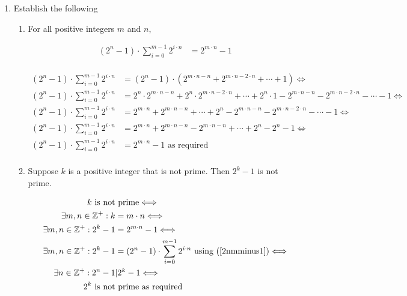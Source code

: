 \documentclass[10pt,\jkfside,a4paper]{article}
\begin{document}
\begin{enumerate}

\item Establish the following

\begin{enumerate}

\item For all positive integers $m$ and $n$,

\begin{equation}
\begin{split}
(2^n - 1)\cdot \sum^{m-1}_{i=0} 2^{i \cdot n} &= 2^{m \cdot n} - 1\\
\end{split}
\end{equation}

\begin{equation}\label{2nmminus1}
\begin{split}
(2^n - 1)\cdot \sum^{m-1}_{i=0} 2^{i \cdot n} &= (2^n - 1)\cdot(2^{m \cdot n - n} + 2^{m \cdot n - 2\cdot n} + \cdots + 1) \Longleftrightarrow\\
(2^n - 1)\cdot \sum^{m-1}_{i=0} 2^{i \cdot n} &= 2^n \cdot 2^{m \cdot n - n} + 2^n \cdot 2^{m \cdot n - 2\cdot n} + \cdots + 2^n \cdot 1 - 2^{m \cdot n - n} - 2^{m \cdot n - 2\cdot n} - \cdots - 1 \Longleftrightarrow \\
(2^n - 1)\cdot \sum^{m-1}_{i=0} 2^{i \cdot n} &= 2^{m \cdot n} + 2^{m \cdot n - n} + \cdots + 2^n - 2^{m \cdot n - n} - 2^{m \cdot n - 2\cdot n} - \cdots - 1 \Longleftrightarrow \\
(2^n - 1)\cdot \sum^{m-1}_{i=0} 2^{i \cdot n} &= 2^{m \cdot n} + 2^{m \cdot n - n} - 2^{m \cdot n - n} + \cdots + 2^n - 2^n - 1 \Longleftrightarrow \\
(2^n - 1)\cdot \sum^{m-1}_{i=0} 2^{i \cdot n} &= 2^{m \cdot n} - 1 \text{ as required} \\
\end{split}
\end{equation}

\item Suppose $k$ is a positive integer that is not prime. Then $2^k - 1$ is not prime.

\begin{equation}
\begin{split}
k \text{ is not}&\text{ prime} \Longleftrightarrow \\
\exists m, n \in \mathbb{Z}^+: k &= m \cdot n \Longleftrightarrow \\
\exists m, n \in \mathbb{Z}^+: 2^k - 1 &= 2^{m\cdot n} - 1\Longleftrightarrow\\
\exists m, n \in \mathbb{Z}^+: 2^k - 1 &= (2^n - 1)\cdot \sum^{m-1}_{i=0}2^{i \cdot n} \text{ using (\ref{2nmminus1})}\Longleftrightarrow\\
\exists n \in \mathbb{Z}^+: 2^n - 1 &| 2^k - 1 \Longleftrightarrow\\
2^k \text{ is not}&\text{ prime as required}\\
\end{split}
\end{equation}


\end{enumerate}
\end{enumerate}
\end{document}
